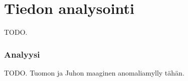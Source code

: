 
\chapter{Tiedon analysointi}

TODO.

\subsection{Analyysi}

TODO. Tuomon ja Juhon maaginen anomaliamylly tähän.
